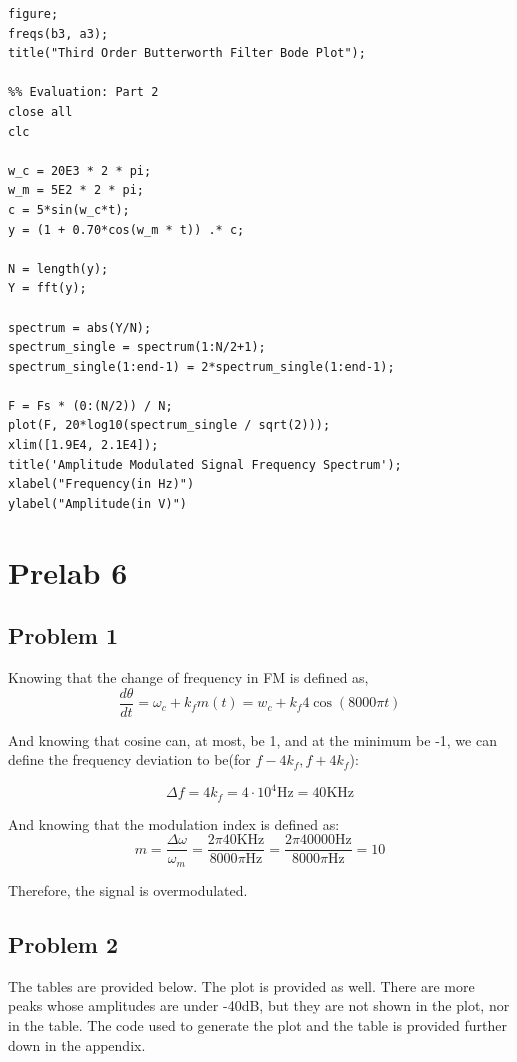 \begin{verbatim}
figure;
freqs(b3, a3);
title("Third Order Butterworth Filter Bode Plot");

%% Evaluation: Part 2
close all
clc

w_c = 20E3 * 2 * pi;
w_m = 5E2 * 2 * pi;
c = 5*sin(w_c*t);
y = (1 + 0.70*cos(w_m * t)) .* c;

N = length(y);
Y = fft(y);

spectrum = abs(Y/N);
spectrum_single = spectrum(1:N/2+1);
spectrum_single(1:end-1) = 2*spectrum_single(1:end-1);

F = Fs * (0:(N/2)) / N;
plot(F, 20*log10(spectrum_single / sqrt(2)));
xlim([1.9E4, 2.1E4]);
title('Amplitude Modulated Signal Frequency Spectrum');
xlabel("Frequency(in Hz)")
ylabel("Amplitude(in V)")
\end{verbatim}

\section{Prelab 6}

\subsection{Problem 1}
Knowing that the change of frequency in FM is defined as,
\begin{equation}
    \frac{d\theta}{dt} = \omega_c + k_f m(t) = w_c + k_f 4\cos(8000\pi t)
\end{equation}

And knowing that cosine can, at most, be 1, and at the minimum be -1, we can define the frequency deviation to be(for $f - 4k_f, f + 4k_f$):

\begin{equation}
    \Delta f = 4k_f = 4\cdot 10^4\text{Hz} = 40\text{KHz}
\end{equation}

And knowing that the modulation index is defined as:
\begin{equation}
    m = \frac{\Delta \omega}{\omega_m} = \frac{2\pi 40\text{KHz}}{8000 \pi\text{Hz}} = \frac{2\pi 40000\text{Hz}}{8000\pi\text{Hz}} = 10
\end{equation}

Therefore, the signal is overmodulated.

\newpage
\subsection{Problem 2}
The tables are provided below. The plot is provided as well. There are more peaks whose amplitudes are under -40dB, but they are not shown in the plot, nor in the table. The code used to generate the plot and the table is provided further down in the appendix.

